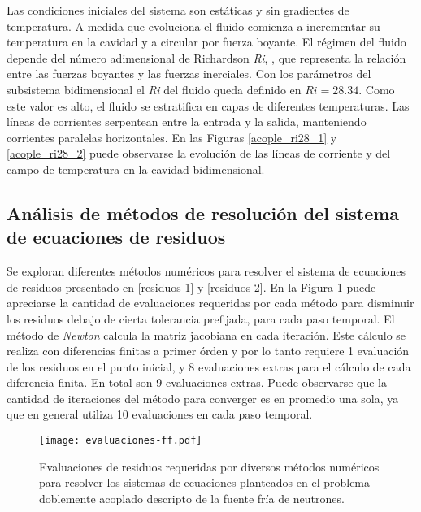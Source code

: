 Las condiciones iniciales del sistema son estáticas y sin gradientes de temperatura.
A medida que evoluciona el fluido comienza a incrementar su temperatura en la cavidad y a circular por fuerza boyante.
El régimen del fluido depende del número adimensional de Richardson \textit{Ri}, \cite{richardson},
que representa la relación entre las fuerzas boyantes y las fuerzas inerciales.
Con los parámetros del subsistema bidimensional el \textit{Ri} del fluido queda definido en $Ri=28.34$.
Como este valor es alto, el fluido se estratifica en capas de diferentes temperaturas.
Las líneas de corrientes serpentean entre la entrada y la salida, manteniendo corrientes paralelas horizontales.
En las Figuras \ref{acople_ri28_1} y \ref{acople_ri28_2} puede observarse 
la evolución de las líneas de corriente y del campo de temperatura en la cavidad bidimensional.

\subsection*{Análisis de métodos de resolución del sistema de ecuaciones de residuos}

Se exploran diferentes métodos numéricos para resolver el sistema de ecuaciones de residuos presentado en \ref{residuos-1} y \ref{residuos-2}.
En la Figura \ref{iteraciones_ri} puede apreciarse la cantidad de evaluaciones requeridas 
por cada método para disminuir los residuos debajo de cierta tolerancia prefijada, para cada paso temporal.
El método de \textit{Newton} calcula la matriz jacobiana en cada iteración.
Este cálculo se realiza con diferencias finitas a primer órden y por lo tanto requiere 1 evaluación de los residuos en el punto inicial, y 8 evaluaciones extras para el cálculo de cada diferencia finita.
En total son 9 evaluaciones extras.
Puede observarse que la cantidad de iteraciones del método para converger es en promedio una sola, ya que en general utiliza 10 evaluaciones en cada paso temporal.

\begin{figure}[ht]
\centering{}\texttt{[image: evaluaciones-ff.pdf]}
\caption{Evaluaciones de residuos requeridas por diversos métodos numéricos para resolver los sistemas de ecuaciones planteados
 en el problema doblemente acoplado descripto de la fuente fría de neutrones.} \label{iteraciones_ri} 
\end{figure}

